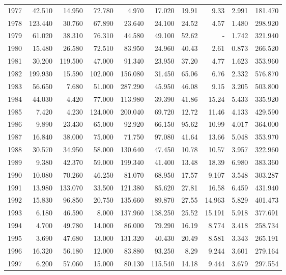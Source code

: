 \documentclass[
]{scrartcl}
\begin{document}
\begin{longtable}{rrrrrrrrrr}
1977 & 42.510 & 14.950 & 72.780 & 4.970 & 17.020 & 19.91 & 9.33 & 2.991 & 181.470 \\ 
1978 & 123.440 & 30.760 & 67.890 & 23.640 & 24.100 & 24.52 & 4.57 & 1.480 & 298.920 \\ 
1979 & 61.020 & 38.310 & 76.310 & 44.580 & 49.100 & 52.62 &  -  & 1.742 & 321.940 \\ 
1980 & 15.480 & 26.580 & 72.510 & 83.950 & 24.960 & 40.43 & 2.61 & 0.873 & 266.520 \\ 
1981 & 30.200 & 119.500 & 47.000 & 91.340 & 23.950 & 37.20 & 4.77 & 1.623 & 353.960 \\ 
1982 & 199.930 & 15.590 & 102.000 & 156.080 & 31.450 & 65.06 & 6.76 & 2.332 & 576.870 \\ 
1983 & 56.650 & 7.680 & 51.000 & 287.290 & 45.950 & 46.08 & 9.15 & 3.205 & 503.800 \\ 
1984 & 44.030 & 4.420 & 77.000 & 113.980 & 39.390 & 41.86 & 15.24 & 5.433 & 335.920 \\ 
1985 & 7.420 & 4.230 & 124.000 & 200.040 & 69.720 & 12.72 & 11.46 & 4.133 & 429.590 \\ 
1986 & 9.890 & 23.430 & 65.000 & 92.920 & 66.150 & 95.62 & 10.99 & 4.017 & 364.000 \\ 
1987 & 16.840 & 38.000 & 75.000 & 71.750 & 97.080 & 41.64 & 13.66 & 5.048 & 353.970 \\ 
1988 & 30.570 & 34.950 & 58.000 & 130.640 & 47.450 & 10.78 & 10.57 & 3.957 & 322.960 \\ 
1989 & 9.380 & 42.370 & 59.000 & 199.340 & 41.400 & 13.48 & 18.39 & 6.980 & 383.360 \\ 
1990 & 10.080 & 70.260 & 46.250 & 81.070 & 68.950 & 17.57 & 9.107 & 3.548 & 303.287 \\ 
1991 & 13.980 & 133.070 & 33.500 & 121.380 & 85.620 & 27.81 & 16.58 & 6.459 & 431.940 \\ 
1992 & 15.830 & 96.850 & 20.750 & 135.660 & 89.870 & 27.55 & 14.963 & 5.829 & 401.473 \\ 
1993 & 6.180 & 46.590 & 8.000 & 137.960 & 138.250 & 25.52 & 15.191 & 5.918 & 377.691 \\ 
1994 & 4.700 & 49.780 & 14.000 & 86.000 & 79.290 & 16.19 & 8.774 & 3.418 & 258.734 \\ 
1995 & 3.690 & 47.680 & 13.000 & 131.320 & 40.430 & 20.49 & 8.581 & 3.343 & 265.191 \\ 
1996 & 16.320 & 56.180 & 12.000 & 83.880 & 93.250 & 8.29 & 9.244 & 3.601 & 279.164 \\ 
1997 & 6.200 & 57.060 & 15.000 & 80.130 & 115.540 & 14.18 & 9.444 & 3.679 & 297.554 \\ 

\end{longtable}
\end{document}
